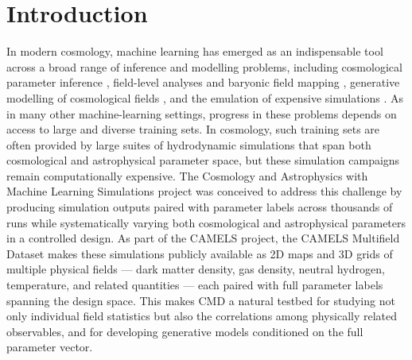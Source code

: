\documentclass[usenatbib]{mnras}
\begin{document}
\section{Introduction}
\label{sec:intro}

In modern cosmology, machine learning has emerged as an indispensable
tool across a broad range of inference and modelling problems,
including cosmological parameter inference
\citep{Ravanbakhsh2017,Cranmer2020}, field-level analyses and baryonic
field mapping \citep{JoKim2019,Zhang2019}, generative modelling of
cosmological fields \citep{Mustafa2019}, and the emulation of
expensive simulations \citep{He2019,Perraudin2021}.
As in many other machine-learning settings, progress in these problems
depends on access to large and diverse training sets. In cosmology,
such training sets are often provided by large suites of hydrodynamic
simulations that span both cosmological and astrophysical parameter
space, but these simulation campaigns remain computationally expensive.
The Cosmology and Astrophysics with Machine Learning Simulations
\citep[CAMELS;][]{Villaescusa2021} project was conceived to address
this challenge by producing simulation outputs paired with parameter
labels across thousands of runs while systematically varying both
cosmological and astrophysical parameters in a controlled design.
As part of the CAMELS project, the CAMELS Multifield Dataset
\citep[CMD;][]{Villaescusa2022} makes these simulations publicly
available as 2D maps and 3D grids of multiple physical fields ---
dark matter density, gas density, neutral hydrogen, temperature, and
related quantities --- each paired with full parameter labels spanning
the design space.
This makes CMD a natural
testbed for studying not only individual field statistics but also
the correlations among physically related observables, and for
developing generative models conditioned on the full parameter vector.
\end{document}
